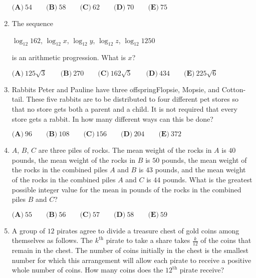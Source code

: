 \documentclass{article}
\begin{document}
\begin{enumerate}[label=\arabic*., itemsep=0.5em]
$ \textbf{(A)} \ 54 \qquad \textbf{(B)} \ 58 \qquad  \textbf{(C)} \ 62 \qquad \textbf{(D)} \ 70 \qquad \textbf{(E)} \ 75 $\par \vspace{0.5em}\item The sequence

$\log_{12}{162}$, $\log_{12}{x}$, $\log_{12}{y}$, $\log_{12}{z}$, $\log_{12}{1250}$

is an arithmetic progression. What is $x$?

$ \textbf{(A)} \ 125\sqrt{3} \qquad \textbf{(B)} \ 270 \qquad \textbf{(C)} \ 162\sqrt{5} \qquad \textbf{(D)} \ 434 \qquad \textbf{(E)} \ 225\sqrt{6}$\par \vspace{0.5em}\item Rabbits Peter and Pauline have three offspringFlopsie, Mopsie, and Cotton-tail. These five rabbits are to be distributed to four different pet stores so that no store gets both a parent and a child. It is not required that every store gets a rabbit. In how many different ways can this be done?

$\textbf{(A)} \ 96 \qquad  \textbf{(B)} \ 108 \qquad  \textbf{(C)} \ 156 \qquad  \textbf{(D)} \ 204 \qquad  \textbf{(E)} \ 372 $\par \vspace{0.5em}\item $A$, $B$, $C$ are three piles of rocks. The mean weight of the rocks in $A$ is $40$ pounds, the mean weight of the rocks in $B$ is $50$ pounds, the mean weight of the rocks in the combined piles $A$ and $B$ is $43$ pounds, and the mean weight of the rocks in the combined piles $A$ and $C$ is $44$ pounds. What is the greatest possible integer value for the mean in pounds of the rocks in the combined piles $B$ and $C$?

$ \textbf{(A)} \ 55 \qquad \textbf{(B)} \ 56 \qquad \textbf{(C)} \ 57 \qquad \textbf{(D)} \ 58 \qquad \textbf{(E)} \ 59$\par \vspace{0.5em}\item A group of $ 12 $ pirates agree to divide a treasure chest of gold coins among themselves as follows. The $ k^\text{th} $ pirate to take a share takes $ \frac{k}{12} $ of the coins that remain in the chest. The number of coins initially in the chest is the smallest number for which this arrangement will allow each pirate to receive a positive whole number of coins. How many coins does the $ 12^{\text{th}} $ pirate receive?


\end{enumerate}
\end{document}
